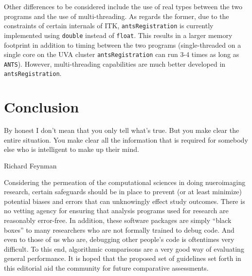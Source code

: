 \documentclass[final,5p,times,twocolumn]{elsarticle}
\begin{document}
Other differences to be considered include the use of real types
 between the
two programs and the use of multi-threading.  As regards the former, due to 
the constraints of certain  internals of ITK,  \verb#antsRegistration#
is currently implemented using \verb#double# instead of \verb#float#.  This
results in a larger memory footprint in addition to timing between the two
programs (single-threaded on a single core on the UVA cluster \verb#antsRegistration#
can run 3-4 times as long as \verb#ANTS#).  However, multi-threading capabilities
are much better developed in \verb#antsRegistration#. 


\section{Conclusion}

\epigraph{By honest I don't mean that you only tell what's true. But you make clear the 
entire situation. You make clear all the information that is required for somebody else 
who is intelligent to make up their mind.}{Richard Feynman}

Considering the permeation of the computational sciences in doing 
nueroimaging research, certain safeguards should be in place to prevent
(or at least minimize) potential biases and errors that can
unknowingly effect study outcomes.  There is no vetting agency for
ensuring that analysis programs used for research are reasonably error-free.
In addition, these software packages are simply ``black
boxes'' to many researchers who are not formally trained to debug
code.  And even to those of us who are, debugging other people's code
is oftentimes very difficult.  To this end, algorithmic comparisons are 
a very good way of evaluating general performance.  It is hoped that the
proposed set of guidelines set forth in this editorial aid the community
for future comparative assessments.


\end{document}
